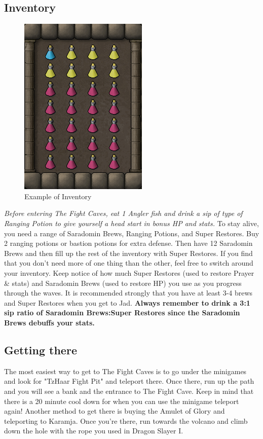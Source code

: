 \documentclass{article}
\newlength\myheight
\newlength\mydepth
\newcommand*\inlinegraphics[1]{%
  \settototalheight\myheight{Xygp}%
  \settodepth\mydepth{Xygp}%
  \raisebox{-\mydepth}{\texttt{[image: \#1]}}%
}
\begin{document}
\subsection{Inventory}
\begin{figure}
\includegraphics[width=.22\textwidth]{inv.png}
\caption*{\small \label{fig:dai}Example of Inventory}
\end{figure}
\normalsize \textit{Before entering The Fight Caves, eat 1 Angler fish and drink a sip of type of Ranging Potion to give yourself a head start in bonus HP and stats.}
To stay alive, you need a range of Saradomin Brews, Ranging Potions, and Super Restores. Buy 2 ranging potions or bastion potions for extra defense. Then have 12 Saradomin Brews and then fill up the rest of the inventory with Super Restores. If you find that you don't need more of one thing than the other, feel free to switch around your inventory. Keep notice of how much Super Restores (used to restore Prayer \& stats) and Saradomin Brews (used to restore HP) you use as you progress through the waves. It is recommended strongly that you have at least 3-4 brews and Super Restores when you get to Jad. \textbf{Always remember to drink a 3:1 sip ratio of Saradomin Brews:Super Restores since the Saradomin Brews debuffs your stats.}
\subsection{Getting there}
The most easiest way to get to The Fight Caves is to go under the minigames \inlinegraphics{minigame.png} and look for "TzHaar Fight Pit" and teleport there. Once there, run up the path and you will see a bank and the entrance to The Fight Cave. Keep in mind that there is a 20 minute cool down for when you can use the minigame teleport again! Another method to get there is buying the Amulet of Glory and teleporting to Karamja. Once you're there, run towards the volcano and climb down the hole with the rope you used in Dragon Slayer I.
\newpage
\end{document}
